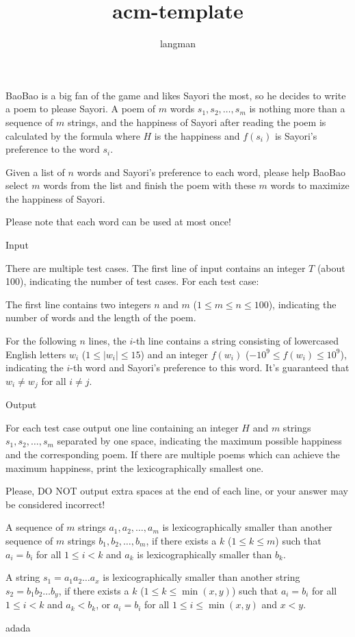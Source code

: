 \documentclass[a4paper,11pt]{article}
\author{langman}
\title{acm-template}
\begin{document}
BaoBao is a big fan of the game and likes Sayori the most, so he decides to write a poem to please Sayori. A poem of $m$ words $s_1, s_2, \dots, s_m$ is nothing more than a sequence of $m$ strings, and the happiness of Sayori after reading the poem is calculated by the formula
where $H$ is the happiness and $f(s_i)$ is Sayori's preference to the word $s_i$.

Given a list of $n$ words and Sayori's preference to each word, please help BaoBao select $m$ words from the list and finish the poem with these $m$ words to maximize the happiness of Sayori.

Please note that each word can be used at most once!

Input

There are multiple test cases. The first line of input contains an integer $T$ (about 100), indicating the number of test cases. For each test case:

The first line contains two integers $n$ and $m$ ($1 \le m \le n \le 100$), indicating the number of words and the length of the poem.

For the following $n$ lines, the $i$-th line contains a string consisting of lowercased English letters $w_i$ ($1 \le |w_i| \le 15$) and an integer $f(w_i)$ ($-10^9 \le f(w_i) \le 10^9$), indicating the $i$-th word and Sayori's preference to this word. It's guaranteed that $w_i \ne w_j$ for all $i \ne j$.

Output

For each test case output one line containing an integer $H$ and $m$ strings $s_1, s_2, \dots, s_m$ separated by one space, indicating the maximum possible happiness and the corresponding poem. If there are multiple poems which can achieve the maximum happiness, print the lexicographically smallest one.

Please, DO NOT output extra spaces at the end of each line, or your answer may be considered incorrect!

A sequence of $m$ strings $a_1, a_2, \dots, a_m$ is lexicographically smaller than another sequence of $m$ strings $b_1, b_2, \dots, b_m$, if there exists a $k$ ($1 \le k \le m$) such that $a_i = b_i$ for all $1 \le i < k$ and $a_k$ is lexicographically smaller than $b_k$.

A string $s_1 = a_1a_2\dots a_x$ is lexicographically smaller than another string $s_2 = b_1b_2\dots b_y$, if there exists a $k$ ($1 \le k \le \min(x, y)$) such that $a_i = b_i$ for all $1 \le i < k$ and $a_k < b_k$, or $a_i = b_i$ for all $1 \le i \le \min(x, y)$ and $x < y$.




\newpage
adada
\end{document}
